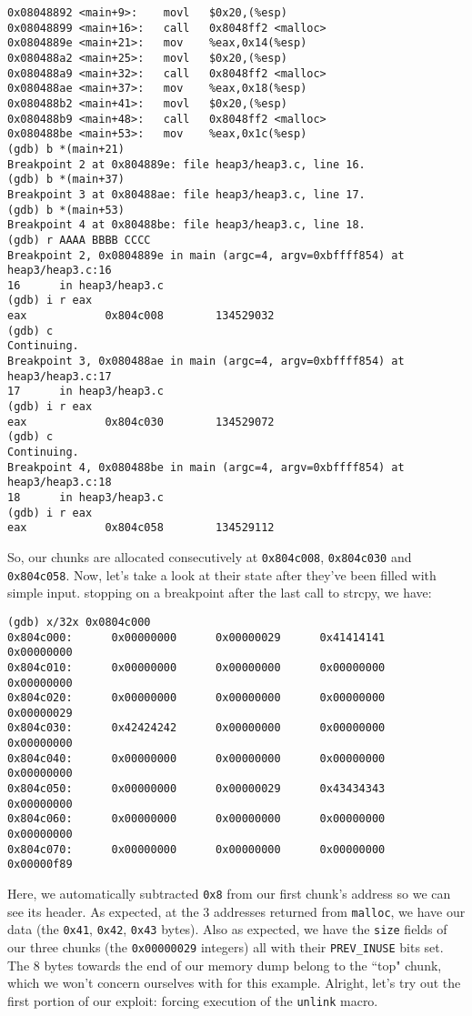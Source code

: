 \begin{lstlisting}
0x08048892 <main+9>:    movl   $0x20,(%esp)
0x08048899 <main+16>:   call   0x8048ff2 <malloc>
0x0804889e <main+21>:   mov    %eax,0x14(%esp)
0x080488a2 <main+25>:   movl   $0x20,(%esp)
0x080488a9 <main+32>:   call   0x8048ff2 <malloc>
0x080488ae <main+37>:   mov    %eax,0x18(%esp)
0x080488b2 <main+41>:   movl   $0x20,(%esp)
0x080488b9 <main+48>:   call   0x8048ff2 <malloc>
0x080488be <main+53>:   mov    %eax,0x1c(%esp)
(gdb) b *(main+21)
Breakpoint 2 at 0x804889e: file heap3/heap3.c, line 16.
(gdb) b *(main+37)
Breakpoint 3 at 0x80488ae: file heap3/heap3.c, line 17.
(gdb) b *(main+53)
Breakpoint 4 at 0x80488be: file heap3/heap3.c, line 18.
(gdb) r AAAA BBBB CCCC
Breakpoint 2, 0x0804889e in main (argc=4, argv=0xbffff854) at heap3/heap3.c:16
16      in heap3/heap3.c
(gdb) i r eax
eax            0x804c008        134529032
(gdb) c
Continuing.
Breakpoint 3, 0x080488ae in main (argc=4, argv=0xbffff854) at heap3/heap3.c:17
17      in heap3/heap3.c
(gdb) i r eax
eax            0x804c030        134529072
(gdb) c
Continuing.
Breakpoint 4, 0x080488be in main (argc=4, argv=0xbffff854) at heap3/heap3.c:18
18      in heap3/heap3.c
(gdb) i r eax
eax            0x804c058        134529112
\end{lstlisting}
So, our chunks are allocated consecutively at \texttt{0x804c008}, \texttt{0x804c030} and \texttt{0x804c058}.
Now, let's take a look at their state after they've been filled with simple input.
stopping on a breakpoint after the last call to strcpy, we have:

\begin{lstlisting}
(gdb) x/32x 0x0804c000
0x804c000:      0x00000000      0x00000029      0x41414141      0x00000000
0x804c010:      0x00000000      0x00000000      0x00000000      0x00000000
0x804c020:      0x00000000      0x00000000      0x00000000      0x00000029
0x804c030:      0x42424242      0x00000000      0x00000000      0x00000000
0x804c040:      0x00000000      0x00000000      0x00000000      0x00000000
0x804c050:      0x00000000      0x00000029      0x43434343      0x00000000
0x804c060:      0x00000000      0x00000000      0x00000000      0x00000000
0x804c070:      0x00000000      0x00000000      0x00000000      0x00000f89
\end{lstlisting}

Here, we automatically subtracted \texttt{0x8} from our first chunk's address so
we can see its header. As expected, at the 3 addresses returned from \texttt{malloc},
we have our data (the \texttt{0x41}, \texttt{0x42}, \texttt{0x43} bytes). Also
as expected, we have the \texttt{size} fields of our three chunks (the \texttt{0x00000029} integers)
all with their \texttt{PREV\_INUSE} bits set. The 8 bytes towards the end of our
memory dump belong to the ``top" chunk, which we won't concern ourselves with
for this example. Alright, let's try out the first portion of our exploit: forcing
execution of the \texttt{unlink} macro.

